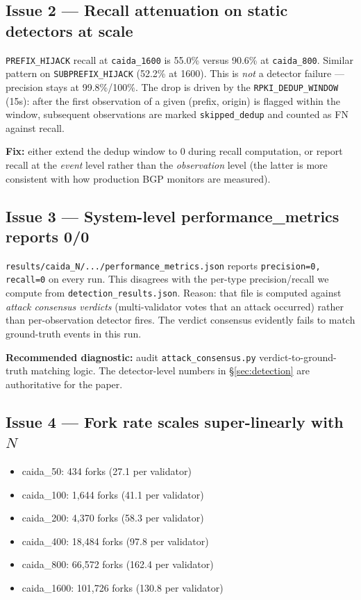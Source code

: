 \documentclass[10pt,a4paper]{article}
\begin{document}
\subsection{Issue 2 --- Recall attenuation on static detectors at scale}

\texttt{PREFIX\_HIJACK} recall at \texttt{caida\_1600} is 55.0\% versus
90.6\% at \texttt{caida\_800}. Similar pattern on \texttt{SUBPREFIX\_HIJACK}
(52.2\% at 1600). This is \emph{not} a detector failure --- precision
stays at 99.8\%/100\%. The drop is driven by the \texttt{RPKI\_DEDUP\_WINDOW}
(15s): after the first observation of a given (prefix, origin) is flagged
within the window, subsequent observations are marked \texttt{skipped\_dedup}
and counted as FN against recall.

\textbf{Fix:} either extend the dedup window to $0$ during recall
computation, or report recall at the \emph{event} level rather than
the \emph{observation} level (the latter is more consistent with how
production BGP monitors are measured).

\subsection{Issue 3 --- System-level performance\_metrics reports 0/0}

\texttt{results/caida\_N/.../performance\_metrics.json} reports
\texttt{precision=0, recall=0} on every run. This disagrees with the
per-type precision/recall we compute from
\texttt{detection\_results.json}. Reason: that file is computed against
\emph{attack consensus verdicts} (multi-validator votes that an attack
occurred) rather than per-observation detector fires. The verdict
consensus evidently fails to match ground-truth events in this run.

\textbf{Recommended diagnostic:} audit
\texttt{attack\_consensus.py} verdict-to-ground-truth matching logic. The
detector-level numbers in §\ref{sec:detection} are authoritative for
the paper.

\subsection{Issue 4 --- Fork rate scales super-linearly with $N$}

\begin{itemize}
\item caida\_50: 434 forks (27.1 per validator)
\item caida\_100: 1,644 forks (41.1 per validator)
\item caida\_200: 4,370 forks (58.3 per validator)
\item caida\_400: 18,484 forks (97.8 per validator)
\item caida\_800: 66,572 forks (162.4 per validator)
\item caida\_1600: 101,726 forks (130.8 per validator)
\end{itemize}
\end{document}
